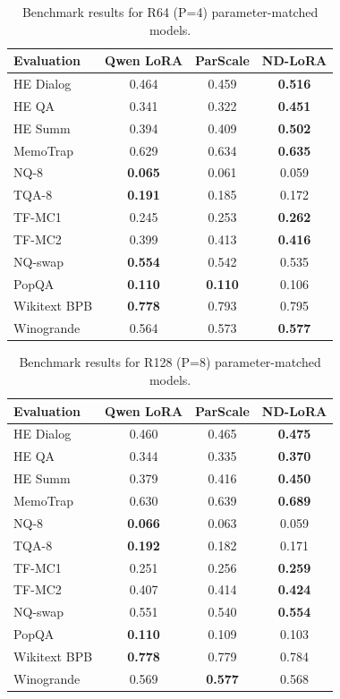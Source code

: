 \documentclass{article} %
\begin{document}
\begin{table}[htbp]
  \centering
  \begin{tabular}{l|ccc}
    \textbf{Evaluation} & \textbf{Qwen LoRA} & \textbf{ParScale} & \textbf{ND-LoRA} \\
    \hline
    HE Dialog & 0.464 & 0.459 & \textbf{0.516} \\
    HE QA & 0.341 & 0.322 & \textbf{0.451} \\
    HE Summ & 0.394 & 0.409 & \textbf{0.502} \\
    MemoTrap & 0.629 & 0.634 & \textbf{0.635} \\
    NQ-8 & \textbf{0.065} & 0.061 & 0.059 \\
    TQA-8 & \textbf{0.191} & 0.185 & 0.172 \\
    TF-MC1 & 0.245 & 0.253 & \textbf{0.262} \\
    TF-MC2 & 0.399 & 0.413 & \textbf{0.416} \\
    NQ-swap & \textbf{0.554} & 0.542 & 0.535 \\
    PopQA & \textbf{0.110} & \textbf{0.110} & 0.106 \\
    Wikitext BPB & \textbf{0.778} & 0.793 & 0.795 \\
    Winogrande & 0.564 & 0.573 & \textbf{0.577} \\
  \end{tabular}
  \caption{
    Benchmark results for R64 (P=4) parameter-matched models.
  }
  \label{tab:results_p4}
\end{table}

\begin{table}[htbp]
  \centering
  \begin{tabular}{l|ccc}
    \textbf{Evaluation} & \textbf{Qwen LoRA} & \textbf{ParScale} & \textbf{ND-LoRA} \\
    \hline
    HE Dialog & 0.460 & 0.465 & \textbf{0.475} \\
    HE QA & 0.344 & 0.335 & \textbf{0.370} \\
    HE Summ & 0.379 & 0.416 & \textbf{0.450} \\
    MemoTrap & 0.630 & 0.639 & \textbf{0.689} \\
    NQ-8 & \textbf{0.066} & 0.063 & 0.059 \\
    TQA-8 & \textbf{0.192} & 0.182 & 0.171 \\
    TF-MC1 & 0.251 & 0.256 & \textbf{0.259} \\
    TF-MC2 & 0.407 & 0.414 & \textbf{0.424} \\
    NQ-swap & 0.551 & 0.540 & \textbf{0.554} \\
    PopQA & \textbf{0.110} & 0.109 & 0.103 \\
    Wikitext BPB & \textbf{0.778} & 0.779 & 0.784 \\
    Winogrande & 0.569 & \textbf{0.577} & 0.568 \\
  \end{tabular}
  \caption{
    Benchmark results for R128 (P=8) parameter-matched models.
  }
  \label{tab:results_p8}
\end{table}
\end{document}
